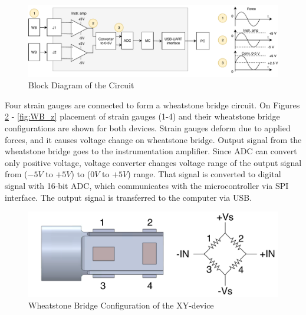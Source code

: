 \begin{figure}[h]
	\begin{center}
	\includegraphics[width=150mm]{fig/methods/PSC_block_wave.pdf}
	\end{center}
	\vspace{-4mm}
	\caption[Block Diagram of the Circuit]
	{Block Diagram of the Circuit}
	\label{fig:PCB_bd}
	\vspace{-2mm}
\end{figure}

Four strain gauges are connected to form a wheatstone bridge circuit. On Figures \ref{fig:WB_xy_dev} - \ref{fig:WB_z} placement of strain gauges (1-4) and their wheatstone bridge configurations are shown for both devices. Strain gauges deform due to applied forces, and it causes voltage change on wheatstone bridge. Output signal from the wheatstone bridge goes to the instrumentation amplifier. Since ADC can convert only positive voltage, voltage converter changes voltage range of the output signal from ($-5V$ to $+5V$) to ($0V$ to $+5V$) range. That signal is converted to digital signal with 16-bit ADC, which communicates with the microcontroller via SPI interface. The output signal is transferred to the computer via USB. 
	
\begin{figure}[h]
	\begin{center}
		\includegraphics[width=120mm]{fig/methods/Wiring_xy_sleeve.pdf}
	\end{center}
	\vspace{-4mm}
	\caption[Wheatstone Bridge Configuration of the XY-device]
	{Wheatstone Bridge Configuration of the XY-device}
	\label{fig:WB_xy_dev}
	\vspace{-2mm}
\end{figure}

